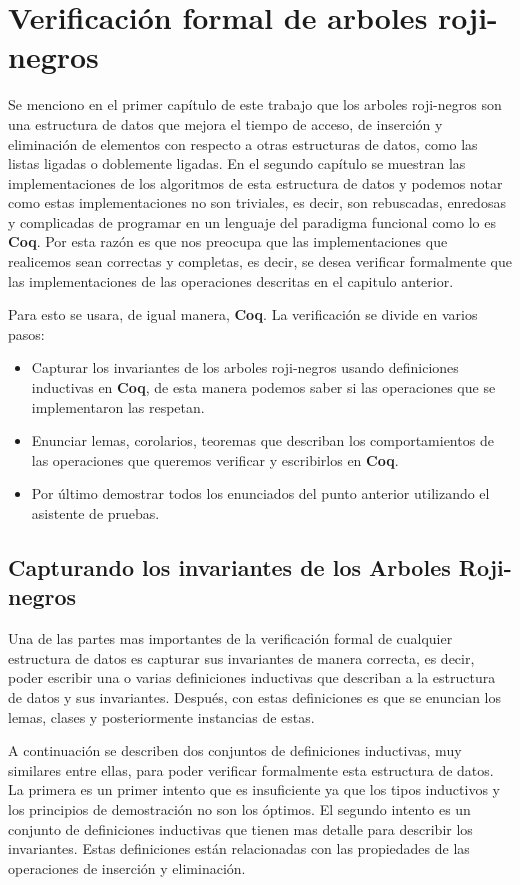 \documentclass[letterpaper,12pt,oneside]{book}
\newcommand{\coq}{\textbf{Coq}}
\newcommand{\Arns}{Arboles Roji-negros}
\newcommand{\arns}{arboles roji-negros}
\theoremstyle{plain}
\theoremstyle{definition}
\theoremstyle{remark}
\begin{document}
\chapter{Verificación formal de {\arns}}
Se menciono en el primer cap\'itulo de este trabajo que los {\arns} son una estructura de datos que mejora el 
tiempo de acceso, de inserción y eliminación de
elementos con respecto a otras estructuras de datos, como las listas ligadas o doblemente ligadas. En el 
segundo cap\'itulo se muestran las implementaciones de los algoritmos de esta  estructura de datos y podemos 
notar como estas implementaciones no son triviales, es decir, son rebuscadas, enredosas y complicadas de 
programar en un lenguaje del paradigma funcional como lo es {\coq}. 
Por esta razón es que nos preocupa que las implementaciones que realicemos sean correctas y completas, es
decir, se desea verificar formalmente que las implementaciones de las operaciones descritas en el 
capitulo anterior.

Para esto se usara, de igual manera, {\coq}. La verificaci\'on se divide en varios pasos:
\begin{itemize}
    \item Capturar los invariantes de los {\arns} usando definiciones inductivas en {\coq}, de esta 
    manera podemos saber si las operaciones que se implementaron las respetan.
    \item Enunciar lemas, corolarios, teoremas que describan los comportamientos de las operaciones que 
    queremos verificar y escribirlos en {\coq}.
    \item Por \'ultimo demostrar todos los enunciados del punto anterior utilizando el asistente de 
    pruebas.
\end{itemize}{}
\section{Capturando los invariantes de los {\Arns}}
Una de las partes mas importantes de la verificaci\'on formal de cualquier estructura de datos es 
capturar sus invariantes de manera correcta, es decir, poder escribir una o varias definiciones 
inductivas que describan a la estructura de datos y sus invariantes. Después, con estas 
definiciones es que se enuncian los lemas, clases y posteriormente instancias de estas. 

A continuaci\'on se describen dos conjuntos de definiciones inductivas, muy similares entre ellas, para 
poder verificar formalmente esta estructura de datos. La primera es un primer intento que es insuficiente
ya que los tipos inductivos y los principios de demostraci\'on no son los \'optimos. El segundo intento 
es un conjunto de definiciones inductivas que tienen mas detalle para describir los invariantes. Estas 
definiciones est\'an relacionadas con las propiedades de las operaciones de inserci\'on y eliminaci\'on. 
\end{document}
